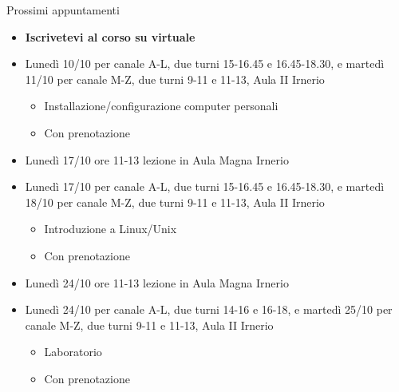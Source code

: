\begin{frame}{Prossimi appuntamenti}
  \begin{itemize}
  \item \textbf{Iscrivetevi al corso su virtuale}
  \item Lunedì 10/10 per canale A-L, due turni 15-16.45 e 16.45-18.30, e martedì
    11/10 per canale M-Z, due turni 9-11 e 11-13, Aula II Irnerio
    \begin{itemize}
    \item Installazione/configurazione computer personali
    \item Con prenotazione
    \end{itemize}

  \item Lunedì 17/10 ore 11-13 lezione in Aula Magna Irnerio

  \item Lunedì 17/10 per canale A-L, due turni 15-16.45 e 16.45-18.30, e martedì
    18/10 per canale M-Z, due turni 9-11 e 11-13, Aula II Irnerio
    \begin{itemize}
    \item Introduzione a Linux/Unix
    \item Con prenotazione
    \end{itemize}

  \item Lunedì 24/10 ore 11-13 lezione in Aula Magna Irnerio

  \item Lunedì 24/10 per canale A-L, due turni 14-16 e 16-18, e martedì
    25/10 per canale M-Z, due turni 9-11 e 11-13, Aula II Irnerio
    \begin{itemize}
    \item Laboratorio
    \item Con prenotazione
    \end{itemize}

  \end{itemize}
\end{frame}
